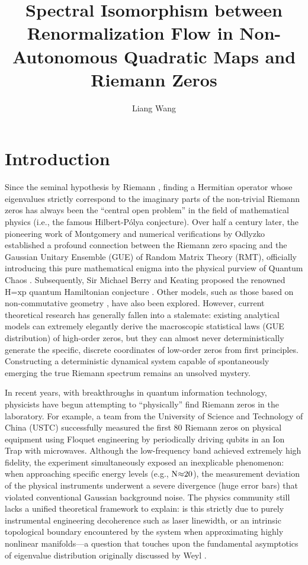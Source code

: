 \documentclass[fleqn,10pt]{wlscirep}
\title{Spectral Isomorphism between Renormalization Flow in Non-Autonomous Quadratic Maps and Riemann Zeros}
\author[1,*]{Liang Wang}
\affil[1]{School of Artificial Intelligence and Automation, Huazhong University of Science and Technology, Wuhan, 430070, P.R. China}
\affil[*]{wangliang.f@gmail.com}
\begin{document}
\flushbottom
\maketitle
\thispagestyle{empty}

\section*{Introduction}

Since the seminal hypothesis by Riemann \cite{riemann1859}, finding a Hermitian
operator whose eigenvalues strictly correspond to the imaginary parts of
the non-trivial Riemann zeros has always been the ``central open problem'' in the
field of mathematical physics (i.e., the famous Hilbert-P\'olya
conjecture). Over half a century later, the pioneering work of
Montgomery \cite{montgomery1973} and numerical verifications by Odlyzko \cite{odlyzko1987}
established a profound connection between the Riemann zero spacing and
the Gaussian Unitary Ensemble (GUE) of Random Matrix Theory (RMT),
officially introducing this pure mathematical enigma into the physical
purview of Quantum Chaos \cite{berry1986}. Subsequently, Sir Michael Berry and
Keating proposed the renowned \(\text{H}\text{=}\text{xp}\) quantum
Hamiltonian conjecture \cite{berry1999}. Other models, such as those based on
non-commutative geometry \cite{connes1999}, have also been explored. However,
current theoretical research has generally fallen into a stalemate:
existing analytical models can extremely elegantly derive the
macroscopic statistical laws (GUE distribution) of high-order zeros, but
they can almost never deterministically generate the specific, discrete
coordinates of low-order zeros from first principles. Constructing a
deterministic dynamical system capable of spontaneously emerging the
true Riemann spectrum remains an unsolved mystery.

In recent years, with breakthroughs in quantum information technology,
physicists have begun attempting to ``physically'' find Riemann zeros in
the laboratory. For example, a team from the University of Science and
Technology of China (USTC) successfully measured the first 80 Riemann
zeros on physical equipment using Floquet engineering by periodically
driving qubits in an Ion Trap with microwaves. Although the
low-frequency band achieved extremely high fidelity, the experiment
simultaneously exposed an inexplicable phenomenon: when approaching
specific energy levels (e.g., \(\text{N}\text{\ensuremath{\approx}20}\)), the measurement
deviation of the physical instruments underwent a severe divergence
(huge error bars) that violated conventional Gaussian background noise.
The physics community still lacks a unified theoretical framework to
explain: is this strictly due to purely instrumental engineering
decoherence such as laser linewidth, or an intrinsic topological
boundary encountered by the system when approximating highly nonlinear
manifolds---a question that touches upon the fundamental asymptotics of
eigenvalue distribution originally discussed by Weyl \cite{weyl1912}.
\end{document}

